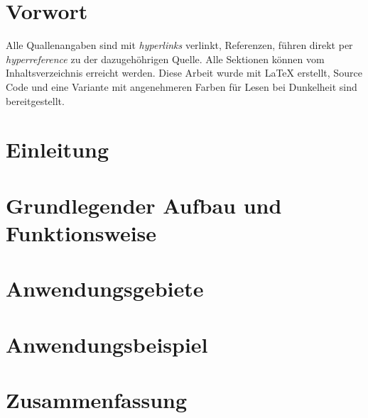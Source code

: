 \documentclass{article}
\begin{document}
    

    \tableofcontents
    \thispagestyle{empty}
    \newpage


    \section{Vorwort}
        Alle Quallenangaben sind mit \textit{hyperlinks} verlinkt,
        Referenzen, führen direkt per \textit{hyperreference} zu der
        dazugehöhrigen Quelle. Alle Sektionen können vom Inhaltsverzeichnis
        erreicht werden. Diese Arbeit wurde mit \LaTeX{} erstellt, Source
        Code und eine Variante mit angenehmeren Farben für Lesen bei
        Dunkelheit sind bereitgestellt.
    \newpage

    \section{Einleitung}
    
    \newpage

    \section{Grundlegender Aufbau und Funktionsweise}
    
    \newpage

    \section{Anwendungsgebiete}
    
    \newpage

    \section{Anwendungsbeispiel}
    
    \newpage

    \section{Zusammenfassung}
    \newpage

    
\end{document}
